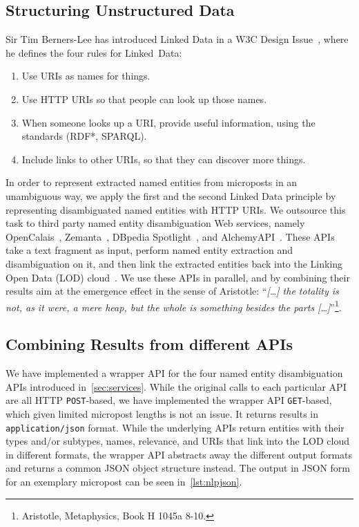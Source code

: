 \documentclass{iosart2c}
\begin{document}
\subsection{Structuring Unstructured Data}    \label{sec:services}
Sir Tim Berners-Lee has introduced Linked Data in a W3C Design Issue~\cite{TimBL:LinkedData}, where he defines the four rules for Linked~Data:
\begin{enumerate}
\item Use URIs as names for things.
\item Use HTTP URIs so that people can look up those names.
\item When someone looks up a URI, provide useful information, using the standards (RDF*, SPARQL).
\item Include links to other URIs, so that they can discover more things.
\end{enumerate}
In order to represent extracted named entities from microposts in an unambiguous way, we apply the first and the second Linked Data principle by representing disambiguated named entities with HTTP URIs.
We outsource this task to third party named entity disambiguation Web services, namely OpenCalais~\cite{OpenCalais}, Zemanta~\cite{Zemanta}, DBpedia Spotlight~\cite{Spotlight}, and AlchemyAPI~\cite{AlchemyApi}.
These APIs take a text fragment as input, perform named entity extraction and disambiguation on it, and then link the extracted entities back into the Linking Open Data (LOD) cloud~\cite{LODcloud}.
We use these APIs in parallel, and by combining their results aim at the emergence effect in the sense of Aristotle: ``\emph{[\ldots] the totality is not, as it were, a mere heap, but the whole is something besides the parts [\ldots]}''\footnote{Aristotle, Metaphysics, Book H 1045a 8-10.}. 

\subsection{Combining Results from different APIs}                     \label{sec:consolidation-nlp}
We have implemented a wrapper API for the four named entity disambiguation APIs introduced in~\autoref{sec:services}.
While the original calls to each particular API are all HTTP \texttt{POST}-based, we have implemented the wrapper API \texttt{GET}-based, which given limited micropost lengths is not an issue.
It returns results in \texttt{application/json} format.
While the underlying APIs return entities with their types and/or subtypes, names, relevance, and URIs that link into the LOD cloud in different formats, the wrapper API abstracts away the different output formats and returns a common JSON object structure instead.
The output in JSON form for an exemplary micropost can be seen in~\autoref{lst:nlpjson}.
\end{document}
